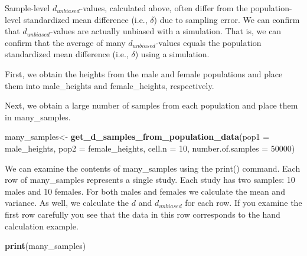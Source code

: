 \documentclass[
]{krantz}
\makeatletter
\newenvironment{Shaded}{\begin{snugshade}}{\end{snugshade}}
\newcommand{\DataTypeTok}[1]{\textcolor[rgb]{0.27,0.27,0.27}{#1}}
\newcommand{\DecValTok}[1]{\textcolor[rgb]{0.06,0.06,0.06}{#1}}
\newcommand{\KeywordTok}[1]{\textcolor[rgb]{0.27,0.27,0.27}{\textbf{#1}}}
\newcommand{\NormalTok}[1]{#1}
\newcommand{\OperatorTok}[1]{\textcolor[rgb]{0.43,0.43,0.43}{\textbf{#1}}}
\newcommand{\StringTok}[1]{\textcolor[rgb]{0.5,0.5,0.5}{#1}}
\newenvironment{kframe}{%
\medskip{}
\setlength{\fboxsep}{.8em}
 \def\at@end@of@kframe{}%
 \ifinner\ifhmode%
  \def\at@end@of@kframe{\end{minipage}}%
  \begin{minipage}{\columnwidth}%
 \fi\fi%
 \def\FrameCommand##1{\hskip\@totalleftmargin \hskip-\fboxsep
 \colorbox{shadecolor}{##1}\hskip-\fboxsep
     \hskip-\linewidth \hskip-\@totalleftmargin \hskip\columnwidth}%
 \MakeFramed {\advance\hsize-\width
   \@totalleftmargin\z@ \linewidth\hsize
   \@setminipage}}%
 {\par\unskip\endMakeFramed%
 \at@end@of@kframe}
\renewenvironment{Shaded}{\begin{kframe}}{\end{kframe}}
\makeatother
\begin{document}
Sample-level \(d_{unbiased}\)-values, calculated above, often differ from the population-level standardized mean difference (i.e., \(\delta\)) due to sampling error. We can confirm that \(d_{unbiased}\)-values are actually unbiased with a simulation. That is, we can confirm that the average of many \(d_{unbiased}\)-values equals the population standardized mean difference (i.e., \(\delta\)) using a simulation.

First, we obtain the heights from the male and female populations and place them into male\_heights and female\_heights, respectively.

\begin{Shaded}
\end{Shaded}

Next, we obtain a large number of samples from each population and place them in many\_samples.

\begin{Shaded}
\begin{Highlighting}[]
\NormalTok{many_samples<-}\StringTok{  }\KeywordTok{get_d_samples_from_population_data}\NormalTok{(}\DataTypeTok{pop1 =}\NormalTok{ male_heights,}
                                   \DataTypeTok{pop2 =}\NormalTok{ female_heights,}
                                   \DataTypeTok{cell.n =} \DecValTok{10}\NormalTok{,}
                                   \DataTypeTok{number.of.samples =} \DecValTok{50000}\NormalTok{)}
\end{Highlighting}
\end{Shaded}

We can examine the contents of many\_samples using the print() command. Each row of many\_samples represents a single study. Each study has two samples: 10 males and 10 females. For both males and females we calculate the mean and variance. As well, we calculate the \(d\) and \(d_{unbiased}\) for each row. If you examine the first row carefully you see that the data in this row corresponds to the hand calculation example.

\begin{Shaded}
\begin{Highlighting}[]
\KeywordTok{print}\NormalTok{(many_samples)}
\end{Highlighting}
\end{Shaded}
\end{document}
